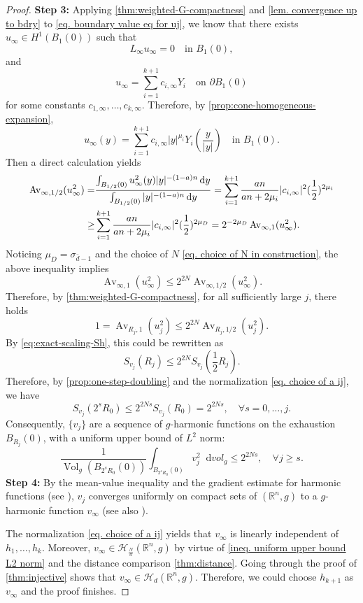 \documentclass[12pt]{amsart}
\theoremstyle{plain}
\theoremstyle{definition}
\theoremstyle{remark}     %
\numberwithin{equation}{section}
\newcommand{\dd}{\mathop{}\!\mathrm{d}}%
\begin{document}
\begin{proof}
{\bf Step 3:} Applying \cref{thm:weighted-G-compactness} and \cref{lem. convergence up to bdry} to \cref{eq. boundary value eq for uj}, we know that there exists $u_\infty\in H^1(B_1(0))$ such that
\[
    L_{\infty}u_\infty=0\quad 
    \text{in } B_1(0),
\]
and 
\[
    u_{\infty}
    =\sum_{i=1}^{k+1} c_{i,\infty}Y_i
    \quad 
    \text{on }\partial B_1(0)
\]
for some constants $c_{1,\infty},\dots, c_{k,\infty}$. Therefore, by \cref{prop:cone-homogeneous-expansion}, 
\[
    u_\infty(y)
    =\sum_{i=1}^{k+1}
    c_{i,\infty}|y|^{\mu_i}
    Y_i\left(\frac{y}{|y|}\right) \quad 
    \text{in }B_1(0).
\]
Then a direct calculation yields
\begin{align*}
    \operatorname{Av}_{\infty,1/2}(u_\infty^2)
    =&\frac{\int_{B_{1/2}(0)}u_\infty^2(y)
    |y|^{-(1-a)n}\dd y}
    {\int_{B_{1/2}(0)}|y|^{-(1-a)n}\dd y}
    =\sum_{i=1}^{k+1}\frac{an}{an+2\mu_i}
    |c_{i,\infty}|^2
    (\frac{1}{2})^{2\mu_i}\notag\\
    \geq& \sum_{i=1}^{k+1}\frac{an}{an+2\mu_i}
    |c_{i,\infty}|^2
    (\frac{1}{2})^{2\mu_D}
    =2^{-2\mu_D}
    \operatorname{Av}_{\infty,1}(u_\infty^2).
\end{align*}
Noticing $\mu_D=\sigma_{\bar{d}-1}$ and the choice of $N$ \cref{eq. choice of N in construction}, the above inequality implies
\[
    \operatorname{Av}_{\infty,1}(u_\infty^2)
    \leq 2^{2N} 
    \operatorname{Av}_{\infty,1/2}(u_\infty^2).
\]
Therefore, by \cref{thm:weighted-G-compactness}, for all sufficiently large $j$, there holds
\[
    1=\operatorname{Av}_{R_j,1}(u_j^2)
    \leq 2^{2N} 
    \operatorname{Av}_{R_j,1/2}(u_j^2).
\]
By \cref{eq:exact-scaling-Sh}, this could be rewritten as
\[
    S_{v_j}(R_j)
    \leq 2^{2N}S_{v_j}
    \left(\frac{1}{2}R_j\right).
\]
Therefore, by \cref{prop:one-step-doubling} and the normalization \cref{eq. choice of a ij}, we have
\[
    S_{v_j}(2^sR_0)
    \leq 2^{2Ns}S_{v_j}(R_0)=2^{2Ns},\quad 
    \forall s=0,\dots, j.
\]
Consequently, $\{v_j\}$ are a sequence of $g$-harmonic functions on the exhaustion $B_{R_j}(0)$, with a uniform upper bound of $L^2$ norm:
\begin{equation}\label{ineq. uniform upper bound L2 norm}
    \frac{1}
    {\operatorname{Vol}_g(B_{2^sR_0}(0))}
    \int_{B_{2^sR_0}(0)}v_j^2\dd vol_g
    \leq 2^{2Ns},\quad 
    \forall j\geq s.
\end{equation}
{\bf Step 4:} 
By the mean-value inequality \cite[Theorem 2.1]{LS} and the gradient estimate for harmonic functions (see \cite[Theorem 1.1]{L2}), $v_j$ converges uniformly on compact sets of $(\mathbb{R}^n,g)$ to a $g$-harmonic function $v_\infty$ (see also \cite[Lemma 2.1]{L2}). 

The normalization \cref{eq. choice of a ij} yields that $v_\infty$ is linearly independent of $h_1,\dots, h_k$.
Moreover, $v_\infty\in \mathcal H_{\frac{N}{a}}(\mathbb{R}^n,g)$ by virtue of \cref{ineq. uniform upper bound L2 norm} and the distance comparison \cref{thm:distance}. Going through the proof of \cref{thm:injective} shows that $v_\infty\in \mathcal H_{d}(\mathbb{R}^n,g)$. Therefore, we could choose $h_{k+1}$ as $v_\infty$ and the proof finishes.
\end{proof}
\end{document}
